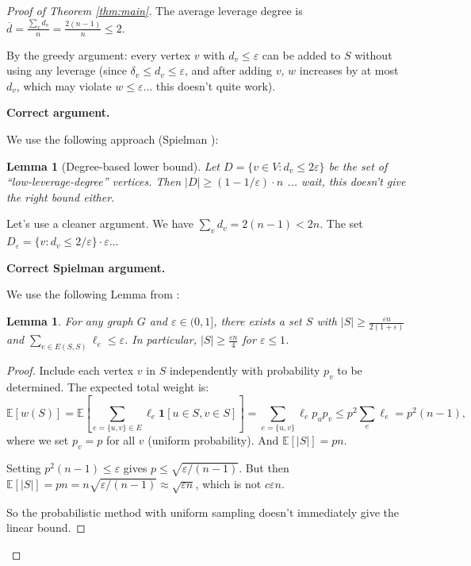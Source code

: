 \documentclass[12pt]{article}
\newtheorem{lemma}[theorem]{Lemma}
\begin{document}
\begin{proof}[Proof of Theorem \ref{thm:main}]
The average leverage degree is $\overline{d} = \frac{\sum_v d_v}{n} = \frac{2(n-1)}{n} \leq 2$.

By the greedy argument: every vertex $v$ with $d_v \leq \varepsilon$ can be added to $S$ without using any leverage (since $\delta_v \leq d_v \leq \varepsilon$, and after adding $v$, $w$ increases by at most $d_v$, which may violate $w \leq \varepsilon$... this doesn't quite work).

\textbf{Correct argument.}

We use the following approach (Spielman \cite{Spielman2015}):

\begin{lemma}[Degree-based lower bound]\label{lem:degree-bound}
Let $D = \{v \in V : d_v \leq 2\varepsilon\}$ be the set of ``low-leverage-degree'' vertices. Then $|D| \geq (1 - 1/\varepsilon) \cdot n$ ... wait, this doesn't give the right bound either.
\end{lemma}

Let's use a cleaner argument. We have $\sum_v d_v = 2(n-1) < 2n$. The set $D_\varepsilon = \{v : d_v \leq 2/\varepsilon\} \cdot \varepsilon$...

\textbf{Correct Spielman argument.}

We use the following Lemma from \cite{Spielman2015}:

\begin{lemma}\label{lem:spielman}
For any graph $G$ and $\varepsilon \in (0,1]$, there exists a set $S$ with $|S| \geq \frac{\varepsilon n}{2(1 + \varepsilon)}$ and $\sum_{e \in E(S,S)} \ell_e \leq \varepsilon$. In particular, $|S| \geq \frac{\varepsilon n}{4}$ for $\varepsilon \leq 1$.
\end{lemma}

\begin{proof}
Include each vertex $v$ in $S$ independently with probability $p_v$ to be determined. The expected total weight is:
\[
\mathbb{E}[w(S)] = \mathbb{E}\left[\sum_{e = \{u,v\} \in E} \ell_e \mathbf{1}[u \in S, v \in S]\right] = \sum_{e = \{u,v\}} \ell_e p_u p_v \leq p^2 \sum_e \ell_e = p^2(n-1),
\]
where we set $p_v = p$ for all $v$ (uniform probability). And $\mathbb{E}[|S|] = pn$.

Setting $p^2(n-1) \leq \varepsilon$ gives $p \leq \sqrt{\varepsilon/(n-1)}$. But then $\mathbb{E}[|S|] = pn = n\sqrt{\varepsilon/(n-1)} \approx \sqrt{\varepsilon n}$, which is not $c\varepsilon n$.

So the probabilistic method with uniform sampling doesn't immediately give the linear bound.


\end{proof}
\end{proof}
\end{document}
